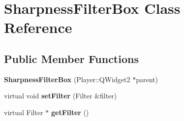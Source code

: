 \hypertarget{classSharpnessFilterBox}{}\section{Sharpness\+Filter\+Box Class Reference}
\label{classSharpnessFilterBox}
\subsection*{Public Member Functions}
\begin{DoxyCompactItemize}
\item 
\hypertarget{classSharpnessFilterBox_ae9842af38584919b23b5dff65bae1b06}{}{\bfseries Sharpness\+Filter\+Box} (Player\+::\+Q\+Widget2 $\ast$parent)\label{classSharpnessFilterBox_ae9842af38584919b23b5dff65bae1b06}

\item 
\hypertarget{classSharpnessFilterBox_a09e99b0db09b8468ce7d7e0f98293ac5}{}virtual void {\bfseries set\+Filter} (Filter \&filter)\label{classSharpnessFilterBox_a09e99b0db09b8468ce7d7e0f98293ac5}

\item 
\hypertarget{classSharpnessFilterBox_ad7b14770615490d1445c958c79fd3adb}{}virtual Filter $\ast$ {\bfseries get\+Filter} ()\label{classSharpnessFilterBox_ad7b14770615490d1445c958c79fd3adb}

\end{DoxyCompactItemize}
